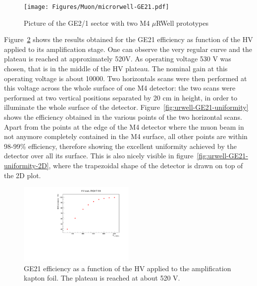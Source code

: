 %
\begin{figure}[h]
	\begin{center}
    	\texttt{[image: Figures/Muon/microrwell-GE21.pdf]}
        \caption{Picture of the GE2/1 sector with two M4 $\mu$RWell prototypes}
        \label{GE2/1}
    \end{center}
\end{figure}

Figure~\ref{fig:urwell-GE21-eff-gain} shows the results obtained for the GE21 efficiency as function of the HV applied to its amplification stage. 
One can observe the very regular curve and the plateau is reached at approximately 520V.
As operating voltage 530 V was chosen, that is in the middle of the HV plateau. The nominal gain at this operating voltage is about 10000. Two horizontals scans were then performed at this voltage across the whole surface of one M4 detector: the two scans were performed at two vertical positions separated by 20 cm in height, in order to illuminate the whole surface of the detector.
Figure~\ref{fig:urwell-GE21-uniformity} shows the efficiency obtained in the various points of the two horizontal scans. 
Apart from the points at the edge of the M4 detector where the muon beam in not anymore completely contained in the M4 surface, all other points are within 98-99\% efficiency, therefore showing the excellent uniformity achieved by the detector over all its surface. 
This is also nicely visible in figure~\ref{fig:urwell-GE21-uniformity-2D}, where the trapezoidal shape of the detector is drawn on top of the 2D plot.

%
\begin{figure}[h!]
\centering
\includegraphics[width=0.5\textwidth]{Figures/Muon/microrwell-GE21-eff-gain.pdf}
\caption{GE21 efficiency as a function of the HV applied to the amplification kapton foil. The plateau is reached at about 520 V.}
\label{fig:urwell-GE21-eff-gain}
\end{figure}

